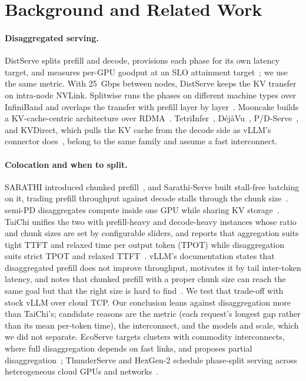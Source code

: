 \documentclass[11pt]{article}
\begin{document}
\section{Background and Related Work}

\paragraph{Disaggregated serving.} DistServe splits prefill and decode, provisions each phase for its own latency target, and measures per-GPU goodput at an SLO attainment target~\cite{distserve}; we use the same metric. With 25~Gbps between nodes, DistServe keeps the KV transfer on intra-node NVLink. Splitwise runs the phases on different machine types over InfiniBand and overlaps the transfer with prefill layer by layer~\cite{splitwise}. Mooncake builds a KV-cache-centric architecture over RDMA~\cite{mooncake}. TetriInfer~\cite{tetriinfer}, D\'ej\`aVu~\cite{dejavu}, P/D-Serve~\cite{pdserve}, and KVDirect, which pulls the KV cache from the decode side as vLLM's connector does~\cite{kvdirect}, belong to the same family and assume a fast interconnect.

\paragraph{Colocation and when to split.} SARATHI introduced chunked prefill~\cite{sarathi2023}, and Sarathi-Serve built stall-free batching on it, trading prefill throughput against decode stalls through the chunk size~\cite{sarathi}. semi-PD disaggregates compute inside one GPU while sharing KV storage~\cite{semipd}. TaiChi unifies the two with prefill-heavy and decode-heavy instances whose ratio and chunk sizes are set by configurable sliders, and reports that aggregation suits tight TTFT and relaxed time per output token (TPOT) while disaggregation suits strict TPOT and relaxed TTFT~\cite{taichi}. vLLM's documentation states that disaggregated prefill does not improve throughput, motivates it by tail inter-token latency, and notes that chunked prefill with a proper chunk size can reach the same goal but that the right size is hard to find~\cite{vllmdocs}. We test that trade-off with stock vLLM over cloud TCP. Our conclusion leans against disaggregation more than TaiChi's; candidate reasons are the metric (each request's longest gap rather than its mean per-token time), the interconnect, and the models and scale, which we did not separate. EcoServe targets clusters with commodity interconnects, where full disaggregation depends on fast links, and proposes partial disaggregation~\cite{ecoserve}; ThunderServe and HexGen-2 schedule phase-split serving across heterogeneous cloud GPUs and networks~\cite{thunderserve,hexgen2}.
\end{document}
